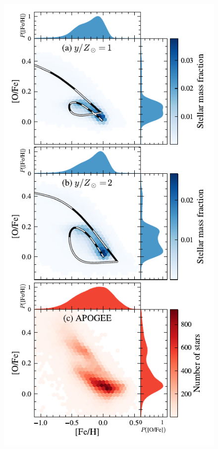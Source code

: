 \documentclass[twocolumn,twocolappendix,linenumbers]{aastex631}
\begin{document}
\begin{figure}
    \centering
    \includegraphics[width=\linewidth]{figures/ofe_feh_density.pdf}

\end{figure}
\end{document}
